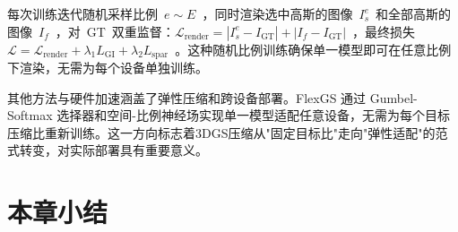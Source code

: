 每次训练迭代随机采样比例~$e \sim E$~，同时渲染选中高斯的图像~$I_s^e$~和全部高斯的图像~$I_f$~，对~GT~双重监督：$\mathcal{L}_\text{render} = |I_s^e - I_\text{GT}| + |I_f - I_\text{GT}|$~，最终损失~$\mathcal{L} = \mathcal{L}_\text{render} + \lambda_1 L_\text{GI} + \lambda_2 L_\text{spar}$~。这种随机比例训练确保单一模型即可在任意比例下渲染，无需为每个设备单独训练。

\begin{takeaway}
其他方法与硬件加速涵盖了弹性压缩和跨设备部署。FlexGS 通过 Gumbel-Softmax 选择器和空间-比例神经场实现单一模型适配任意设备，无需为每个目标压缩比重新训练。这一方向标志着3DGS压缩从"固定目标比"走向"弹性适配"的范式转变，对实际部署具有重要意义。
\end{takeaway}





\section*{本章小结}

